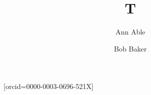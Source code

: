 \documentclass{cas-sc}
\begin{document}
\title [mode = title]{T}
\author[1]{Ann Able}[orcid=0000-0003-0696-521X]
\author[2]{Bob Baker}
\address[1]{Univ X}
\address[2]{Univ Y}
\maketitle
\end{document}

